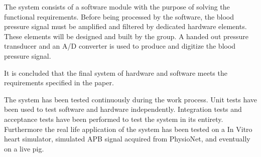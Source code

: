 The system consists of a software module with the purpose of solving the functional requirements. Before being processed by the software, the blood pressure signal must be amplified and filtered by dedicated hardware elements. These elements will be designed and built by the group.
A handed out pressure transducer and an A/D converter is used to produce and digitize the blood pressure signal. 

It is concluded that the final system of hardware and software meets the requirements specified in the paper.

The system has been tested continuously during the work process. Unit tests have been used to test software and hardware independently. Integration tests and acceptance tests have been performed to test the system in its entirety.
Furthermore the real life application of the system has been tested on a In Vitro heart simulator, simulated APB signal acquired from PhysioNet, and eventually on a live pig. 
